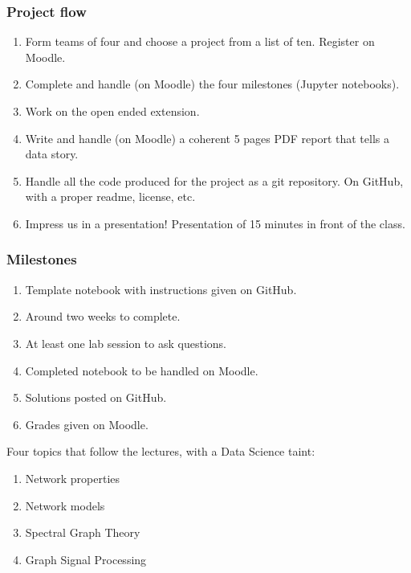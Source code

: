 \documentclass[aspectratio=169]{beamer}
\begin{document}
\begin{frame}
	\frametitle{Project flow}
	\begin{enumerate}
		\item Form teams of four and choose a project from a list of ten. Register on Moodle.
		\vfill
	\item Complete and handle (on Moodle) the four milestones (Jupyter notebooks).
		\vfill
		\item Work on the open ended extension.
		\vfill
	\item Write and handle (on Moodle) a coherent 5 pages PDF report that tells a data story.
		\vfill
		\item Handle all the code produced for the project as a git repository. On GitHub, with a proper readme, license, etc.
		\vfill
		\item Impress us in a presentation! Presentation of 15 minutes in front of the class.
	\end{enumerate}
\end{frame}


\begin{frame}
	\frametitle{Milestones}
	\begin{enumerate}
		\item Template notebook with instructions given on GitHub.
		\item Around two weeks to complete.
		\item At least one lab session to ask questions.
		\item Completed notebook to be handled on Moodle.
		\item Solutions posted on GitHub.
		\item Grades given on Moodle.
	\end{enumerate}
	\vfill
	Four topics that follow the lectures, with a Data Science taint:
	\begin{enumerate}
		\item Network properties
		\item Network models
		\item Spectral Graph Theory
		\item Graph Signal Processing
	\end{enumerate}
\end{frame}
\end{document}
